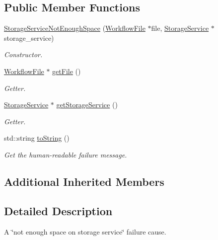 \subsection*{Public Member Functions}
\begin{DoxyCompactItemize}
\item 
\hyperlink{classwrench_1_1_storage_service_not_enough_space_a38d517f15de8e447e5aa1783505cf937}{Storage\+Service\+Not\+Enough\+Space} (\hyperlink{classwrench_1_1_workflow_file}{Workflow\+File} $\ast$file, \hyperlink{classwrench_1_1_storage_service}{Storage\+Service} $\ast$storage\+\_\+service)
\begin{DoxyCompactList}\small\item\em Constructor. \end{DoxyCompactList}\item 
\hyperlink{classwrench_1_1_workflow_file}{Workflow\+File} $\ast$ \hyperlink{classwrench_1_1_storage_service_not_enough_space_a57d85bc5ed469118d3cb235270fffb3e}{get\+File} ()
\begin{DoxyCompactList}\small\item\em Getter. \end{DoxyCompactList}\item 
\hyperlink{classwrench_1_1_storage_service}{Storage\+Service} $\ast$ \hyperlink{classwrench_1_1_storage_service_not_enough_space_a1c480ac68fe40aadd348999d1069c5d0}{get\+Storage\+Service} ()
\begin{DoxyCompactList}\small\item\em Getter. \end{DoxyCompactList}\item 
std\+::string \hyperlink{classwrench_1_1_storage_service_not_enough_space_a42680e32c21db44888e173d6a0358326}{to\+String} ()
\begin{DoxyCompactList}\small\item\em Get the human-\/readable failure message. \end{DoxyCompactList}\end{DoxyCompactItemize}
\subsection*{Additional Inherited Members}


\subsection{Detailed Description}
A \char`\"{}not enough space on storage service\char`\"{} failure cause. 

